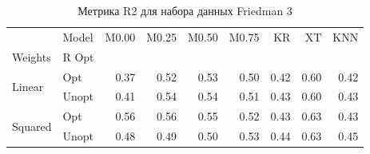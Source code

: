 \begin{table}
\caption{Метрика R2 для набора данных Friedman 3}
\label{tab:R2_Friedman 3}
\begin{tabular}{llrrrrrrr}
\toprule
 & Model & M0.00 & M0.25 & M0.50 & M0.75 & KR & XT & KNN \\
Weights & R Opt &  &  &  &  &  &  &  \\
\midrule
\multirow[t]{2}{*}{Linear} & Opt & 0.37 & 0.52 & 0.53 & 0.50 & 0.42 & 0.60 & 0.42 \\
 & Unopt & 0.41 & 0.54 & 0.54 & 0.51 & 0.43 & 0.60 & 0.43 \\

\multirow[t]{2}{*}{Squared} & Opt & 0.56 & 0.56 & 0.55 & 0.52 & 0.43 & 0.63 & 0.43 \\
 & Unopt & 0.48 & 0.49 & 0.50 & 0.53 & 0.44 & 0.63 & 0.45 \\

\bottomrule
\end{tabular}
\end{table}
